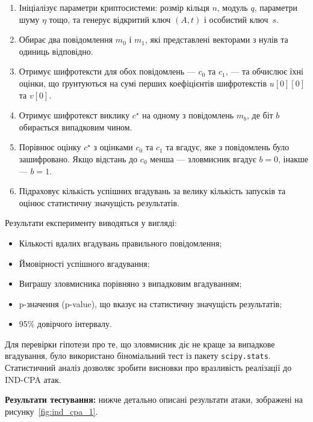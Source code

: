 \begin{enumerate}
    \item Ініціалізує параметри криптосистеми: розмір кільця $n$, модуль $q$, параметри шуму $\eta$ тощо, та генерує відкритий ключ $(A, t)$ і особистий ключ~$s$.
    
    \item Обирає два повідомлення $m_0$ і $m_1$, які представлені векторами з нулів та одиниць відповідно.
    
    \item Отримує шифротексти для обох повідомлень — $c_0$ та $c_1$, — та обчислює їхні оцінки, що ґрунтуються на сумі перших коефіцієнтів шифротекстів $u[0][0]$ та $v[0]$.
    
    \item Отримує шифротекст виклику $c^\star$ на одному з повідомлень $m_b$, де біт $b$ обирається випадковим чином.
    
    \item Порівнює оцінку $c^\star$ з оцінками $c_0$ та $c_1$ та вгадує, яке з повідомлень було зашифровано. Якщо відстань до $c_0$ менша — зловмисник вгадує $b=0$, інакше — $b=1$.
    
    \item Підраховує кількість успішних вгадувань за велику кількість запусків та оцінює статистичну значущість результатів.
\end{enumerate}

Результати експерименту виводяться у вигляді:
\begin{itemize}
    \item Кількості вдалих вгадувань правильного повідомлення;
    \item Ймовірності успішного вгадування;
    \item Виграшу зловмисника порівняно з випадковим вгадуванням;
    \item p-значення (p-value), що вказує на статистичну значущість результатів;
    \item 95\% довірчого інтервалу.
\end{itemize}

Для перевірки гіпотези про те, що зловмисник діє не краще за випадкове вгадування, було використано біноміальний тест із пакету \texttt{scipy.stats}. Статистичний аналіз дозволяє зробити висновки про вразливість реалізації до IND-CPA атак.

\textbf{Результати тестування:} нижче детально описані результати атаки, зображені на рисунку~\ref{fig:ind_cpa_1}.

